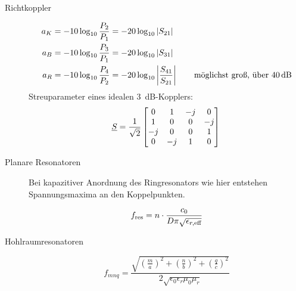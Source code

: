 \begin{description}
\item[Richtkoppler] \strut
\begin{center}
\begin{circuitikz}[scale=0.4, every node/.style={scale=1}]

\end{circuitikz}
\end{center}
\begin{align*}
a_K &= -10\log_\text{10} \frac{P_2}{P_1} = -20\log_\text{10} |S_{21}| \\
a_B &= -10\log_\text{10} \frac{P_3}{P_1} = -20\log_\text{10} |S_{31}| \\
a_R &= -10\log_\text{10} \frac{P_4}{P_2} =  -20\log_\text{10} \left\vert\frac{S_{41}}{S_{21}}\right\vert \qquad \text{möglichst groß, über \SI{40}{\dB}}
\end{align*}
Streuparameter eines idealen \SI{3}{\dB}-Kopplers:
\begin{equation*}
\PKOLmatrix{S} = \frac{1}{\sqrt{2}} \left[ \begin{matrix}
0 & 1 & -j & 0 \\ 
1 & 0 & 0 & -j \\ 
-j & 0 & 0 & 1 \\ 
0 & -j & 1 & 0 \\ 
\end{matrix} \right] \\
\end{equation*}

\item[Planare Resonatoren]
Bei kapazitiver Anordnung des Ringresonators wie hier entstehen Spannungsmaxima an den Koppelpunkten.
\begin{center}
\begin{tikzpicture}[scale=0.5, every node/.style={scale=1}]

\end{tikzpicture}
\end{center}
\begin{equation*}
f_\text{res} = n \cdot \frac{c_0}{D \pi \sqrt{\epsilon_{r,\text{eff}}}} \\
\end{equation*}

\item[Hohlraumresonatoren]
\begin{equation*}
f_{mnq} = \frac{\sqrt{ \left( \frac{m}{a} \right)^2 + \left( \frac{n}{b} \right)^2 + \left( \frac{q}{c} \right)^2}}{2\sqrt{\epsilon_0 \epsilon_r \mu_0 \mu_r}}
\end{equation*}
\end{description}